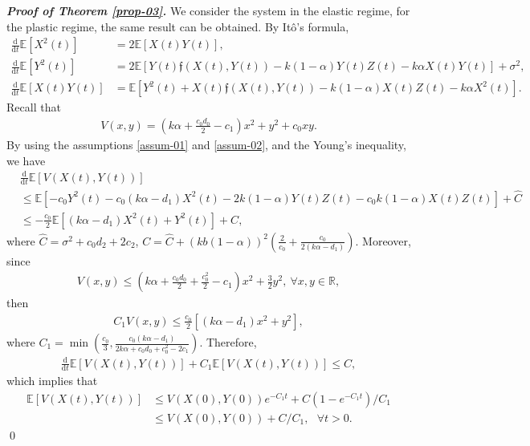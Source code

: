 \documentclass[12pt]{article}
\numberwithin{equation}{section}
\def \R{\mathbb R}
\def \E{\mathbb E}
\def\d{\mathrm{d}}
\begin{document}
{\noindent \it \bf Proof of Theorem \ref{prop-03}.}  
We consider the system in the elastic regime, for the plastic regime, the same result can be obtained. 
By It\^{o}'s formula, 
\begin{align*}
	\frac{\d }{\d t}\E[X^{2}(t)] &= 2\E[X(t)Y(t)], \\
	\frac{\d }{\d t}\E[Y^{2}(t)] &= 2\E[Y(t)\mathfrak{f}(X(t), Y(t)) -k(1-\alpha)Y(t)Z(t) -k\alpha X(t)Y(t)] + \sigma^{2},\\
	\frac{\d }{\d t}\E[X(t)Y(t)] &= \E[Y^{2}(t) + X(t)\mathfrak{f}(X(t), Y(t)) - k(1-\alpha)X(t)Z(t) -k\alpha X^{2}(t)]. 
\end{align*}
Recall that 
\begin{align*}
	V(x, y)  = \left(k\alpha +\frac{c_{0}d_{0}}{2} - c_{1}\right)x^{2} + y^{2} + c_{0} xy. 
\end{align*}
By using the assumptions \eqref{assum-01} and \eqref{assum-02}, 
and the Young's inequality, we have
\begin{align*}
	&\frac{\d }{\d t}\E[V(X(t), Y(t))] \\
	& \leq  \E[-c_{0} Y^{2}(t) - c_{0}(k\alpha - d_{1})X^{2}(t) - 2k(1-\alpha)Y(t)Z(t) - c_{0}k(1-\alpha) X(t)Z(t)] 
	+ \hat{C}\\
	&\leq -\frac{c_{0}}{2} \E[ (k\alpha - d_{1})X^{2}(t) + Y^{2}(t)] + C,
\end{align*}
where $\hat{C} = \sigma^{2} + c_{0}d_{2} + 2 c_{2}$, 
$C = \hat{C} + (kb(1-\alpha))^{2}\left(\frac{2}{c_{0}} + \frac{c_{0}}{2(k\alpha - d_{1})}\right)$. 
Moreover, since
\begin{align*}
	V(x, y) \leq \left(k\alpha +\frac{c_{0}d_{0}}{2} + \frac{c^{2}_{0}}{2} - c_{1}\right)x^{2} + \frac{3}{2}y^{2}, ~\forall x,y\in\R,
\end{align*}
then
\begin{align*}
	C_{1}V(x, y) \leq \frac{c_{0}}{2}[(k\alpha - d_{1})x^{2} + y^{2}], 
\end{align*}
where $C_{1} = \min\left(\frac{c_{0}}{3}, \frac{c_{0}(k\alpha - d_{1})}{2k\alpha +c_{0}d_{0} + c^{2}_{0} - 2c_{1}}\right)$. 
Therefore,
\begin{align*}
	\frac{\d }{\d t}\E[V(X(t), Y(t))] + C_{1}\E[V(X(t), Y(t))]  \leq C,
\end{align*}
which implies that 
\begin{align*}
	\E[V(X(t), Y(t))] &\leq V(X(0), Y(0))e^{-C_{1}t} + C(1-e^{-C_{1}t})/C_{1} \\
	&\leq V(X(0), Y(0))+ C/C_{1},~~~\forall t>0. 
\end{align*} \qed
\end{document}
